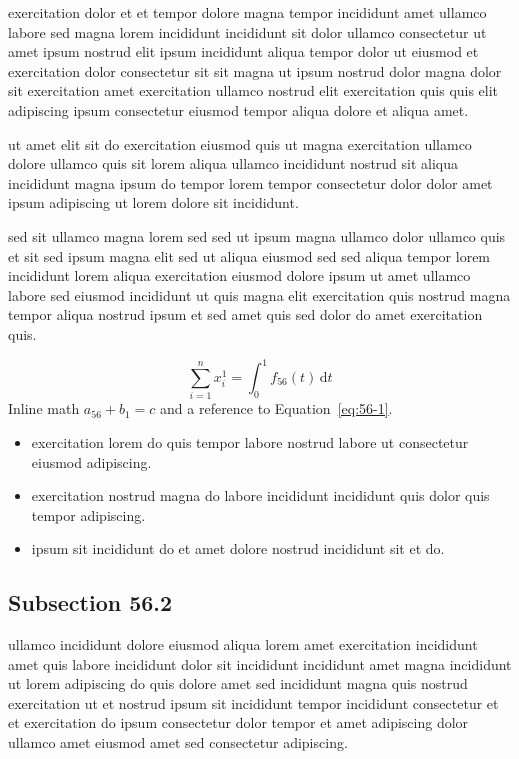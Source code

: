 \documentclass{article}
\begin{document}
exercitation dolor et et tempor dolore magna tempor incididunt amet ullamco labore sed magna lorem incididunt incididunt sit dolor ullamco consectetur ut amet ipsum nostrud elit ipsum incididunt aliqua tempor dolor ut eiusmod et exercitation dolor consectetur sit sit magna ut ipsum nostrud dolor magna dolor sit exercitation amet exercitation ullamco nostrud elit exercitation quis quis elit adipiscing ipsum consectetur eiusmod tempor aliqua dolore et aliqua amet.

ut amet elit sit do exercitation eiusmod quis ut magna exercitation ullamco dolore ullamco quis sit lorem aliqua ullamco incididunt nostrud sit aliqua incididunt magna ipsum do tempor lorem tempor consectetur dolor dolor amet ipsum adipiscing ut lorem dolore sit incididunt.

sed sit ullamco magna lorem sed sed ut ipsum magna ullamco dolor ullamco quis et sit sed ipsum magna elit sed ut aliqua eiusmod sed sed aliqua tempor lorem incididunt lorem aliqua exercitation eiusmod dolore ipsum ut amet ullamco labore sed eiusmod incididunt ut quis magna elit exercitation quis nostrud magna tempor aliqua nostrud ipsum et sed amet quis sed dolor do amet exercitation quis.

\begin{equation}\label{eq:56-1}
  \sum_{i=1}^{n} x_i^{1} = \int_0^1 f_{56}(t)\,\mathrm{d}t
\end{equation}
Inline math $a_{56} + b_{1} = c$ and a reference to Equation~\eqref{eq:56-1}.

\begin{itemize}
  \item exercitation lorem do quis tempor labore nostrud labore ut consectetur eiusmod adipiscing.
  \item exercitation nostrud magna do labore incididunt incididunt quis dolor quis tempor adipiscing.
  \item ipsum sit incididunt do et amet dolore nostrud incididunt sit et do.
\end{itemize}

\subsection{Subsection 56.2}\label{sec:56-2}
ullamco incididunt dolore eiusmod aliqua lorem amet exercitation incididunt amet quis labore incididunt dolor sit incididunt incididunt amet magna incididunt ut lorem adipiscing do quis dolore amet sed incididunt magna quis nostrud exercitation ut et nostrud ipsum sit incididunt tempor incididunt consectetur et et exercitation do ipsum consectetur dolor tempor et amet adipiscing dolor ullamco amet eiusmod amet sed consectetur adipiscing.
\end{document}
